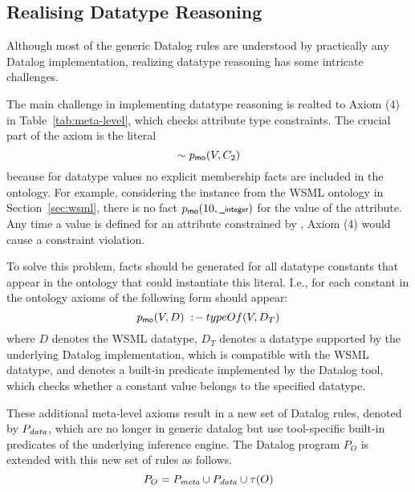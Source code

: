 \def\dataaxioms{\ensuremath{P_{\smtxtit{data}}}\xspace}
\def\transdpred{\transtxt{dpred}}

\subsection{Realising Datatype Reasoning}
\label{sec:datatype_reasoning} Although most of the generic
Datalog rules are understood by practically any Datalog
implementation, realizing datatype reasoning has some intricate
challenges.

The main challenge in implementing datatype reasoning is realted
to Axiom (4) in Table~\ref{tab:meta-level}, which checks attribute
type constraints. The crucial part of the axiom is the literal
\[\sim p_{\mathrm{\sf mo}}(V,C_2)\] because for datatype values no explicit
membership facts are included in the ontology. For example,
considering the instance  from the WSML ontology in
Section~\ref{sec:wsml}, there is no fact
$p_{\mathrm{\sf mo}}(10,\textsf{\scriptsize \_integer})$ for the value of the
 attribute. Any time a value is defined for
an attribute constrained by , Axiom (4) would cause
a constraint violation.

To solve this problem, \pmo facts should be generated for all
datatype constants that appear in the ontology that could
instantiate this literal. I.e., for each constant in the ontology
axioms of the following form should appear:
\begin{displaymath}
    p_{\mathrm{\sf mo}}(V,D) \;:\!-\: typeOf(V, D_T)
\end{displaymath}
where $D$ denotes the WSML datatype, $D_T$ denotes a datatype
supported by the underlying Datalog implementation, which is
compatible with the WSML datatype, and \typeof denotes a built-in
predicate implemented by the Datalog tool, which checks whether a
constant value belongs to the specified datatype.

These additional meta-level axioms result in a new set of Datalog
rules, denoted by \dataaxioms, which are no longer in generic
datalog but use tool-specific built-in predicates of the
underlying inference engine. The Datalog program $P_O$ is extended
with this new set of rules as follows.
\begin{displaymath}
    P_O = \mlaxioms \cup \dataaxioms \cup \tau(O)
\end{displaymath}


